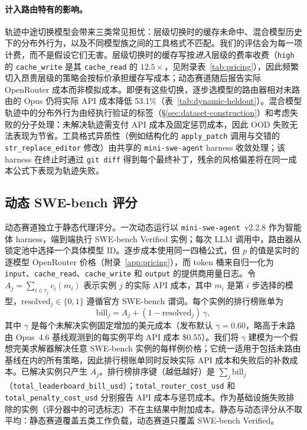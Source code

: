 \paragraph{计入路由特有的影响。}
轨迹中途切换模型会带来三类常见担忧：层级切换时的缓存未命中、混合模型历史下的分布外行为，以及不同模型族之间的工具格式不匹配。我们的评估会为每一项计费，而不是假设它们无害。层级切换时的缓存写按\emph{进入}层级的费率收费（\texttt{high} 的 \texttt{cache\_write} 是其 \texttt{cache\_read} 的 $12.5\times$，见附录表~\ref{tab:pricing}），因此频繁切入昂贵层级的策略会按标价承担缓存写成本；动态赛道随后报告实际 OpenRouter 成本而非模拟成本。即便有这些切换，逐步选模型的路由器相对未路由的 Opus 仍将实际 API 成本降低 53.1\%（表~\ref{tab:dynamic-heldout}）。混合模型轨迹中的分布外行为由经执行验证的标签（\S\ref{sec:dataset-construction}）和考虑失败的分子处理：未解决轨迹需支付 API 成本及固定惩罚成本，因此 OOD 失败无法表现为节省。工具格式异质性（例如结构化的 \texttt{apply\_patch} 调用与交错的 \texttt{str\_replace\_editor} 修改）由共享的 \texttt{mini-swe-agent} harness 收敛处理；该 harness 在终止时通过 \texttt{git diff} 得到每个最终补丁，残余的风格偏差将在同一成本公式下表现为轨迹失败。

\subsection{动态 SWE-bench 评分}
\label{sec:dynamic-scoring}

动态赛道独立于静态代理评分。一次动态运行以 \texttt{mini-swe-agent}~v2.2.8 作为智能体 harness，端到端执行 SWE-bench Verified 实例；每次 LLM 调用中，路由器从锁定池中选择一个具体模型 ID。逐步成本使用同一四桶公式，但 $p$ 的值是实时的逐模型 OpenRouter 价格（附录~\ref{app:pricing}），而 token 桶来自归一化为 \texttt{input}、\texttt{cache\_read}、\texttt{cache\_write} 和 \texttt{output} 的提供商用量日志。令 $A_j=\sum_{i\in\tau_j} c_i(m_i)$ 表示实例 $j$ 的实际 API 成本，其中 $m_i$ 是第 $i$ 步选择的模型，$\mathrm{resolved}_j\in\{0,1\}$ 遵循官方 SWE-bench 谓词。每个实例的排行榜账单为
\[
\mathrm{bill}_j = A_j + (1-\mathrm{resolved}_j)\,\gamma,
\]
其中 $\gamma$ 是每个未解决实例固定增加的美元成本（发布默认 $\gamma{=}0.60$，略高于未路由 Opus~4.6 基线观测到的每实例平均 API 成本 \$0.55）。我们将 $\gamma$ 建模为一个假想完美求解器解决任意 SWE-bench 实例的每样例价格；它统一适用于包括未路由基线在内的所有策略，因此排行榜账单同时反映实际 API 成本和失败后的补救成本。已解决实例只产生 $A_j$。排行榜排序键（越低越好）是 $\sum_j \mathrm{bill}_j$（\texttt{total\_leaderboard\_bill\_usd}）；\texttt{total\_router\_cost\_usd} 和 \texttt{total\_penalty\_cost\_usd} 分别报告 API 成本与惩罚成本。作为基础设施失败排除的实例（评分器中的可选标志）不在主结果中附加成本。静态与动态评分从不取平均：静态赛道覆盖五类工作负载，动态赛道只覆盖 SWE-bench Verified。

